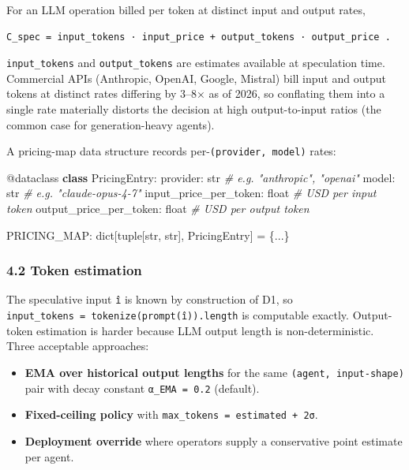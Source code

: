 \documentclass[
  11pt,
]{article}
\newenvironment{Shaded}{}{}
\newcommand{\AttributeTok}[1]{\textcolor[rgb]{0.49,0.56,0.16}{#1}}
\newcommand{\BuiltInTok}[1]{\textcolor[rgb]{0.00,0.50,0.00}{#1}}
\newcommand{\CommentTok}[1]{\textcolor[rgb]{0.38,0.63,0.69}{\textit{#1}}}
\newcommand{\KeywordTok}[1]{\textcolor[rgb]{0.00,0.44,0.13}{\textbf{#1}}}
\newcommand{\NormalTok}[1]{#1}
\newcommand{\OperatorTok}[1]{\textcolor[rgb]{0.40,0.40,0.40}{#1}}
\providecommand{\tightlist}{%
  \setlength{\itemsep}{0pt}\setlength{\parskip}{0pt}}
\begin{document}
For an LLM operation billed per token at distinct input and output
rates,

\begin{verbatim}
C_spec = input_tokens · input_price + output_tokens · output_price .
\end{verbatim}

\texttt{input\_tokens} and \texttt{output\_tokens} are estimates
available at speculation time. Commercial APIs (Anthropic, OpenAI,
Google, Mistral) bill input and output tokens at distinct rates
differing by 3--8× as of 2026, so conflating them into a single rate
materially distorts the decision at high output-to-input ratios (the
common case for generation-heavy agents).

A pricing-map data structure records per-\texttt{(provider,\ model)}
rates:

\begin{Shaded}
\begin{Highlighting}[]
\AttributeTok{@dataclass}
\KeywordTok{class}\NormalTok{ PricingEntry:}
\NormalTok{    provider: }\BuiltInTok{str}                       \CommentTok{\# e.g. "anthropic", "openai"}
\NormalTok{    model: }\BuiltInTok{str}                          \CommentTok{\# e.g. "claude{-}opus{-}4{-}7"}
\NormalTok{    input\_price\_per\_token: }\BuiltInTok{float}        \CommentTok{\# USD per input token}
\NormalTok{    output\_price\_per\_token: }\BuiltInTok{float}       \CommentTok{\# USD per output token}

\NormalTok{PRICING\_MAP: }\BuiltInTok{dict}\NormalTok{[}\BuiltInTok{tuple}\NormalTok{[}\BuiltInTok{str}\NormalTok{, }\BuiltInTok{str}\NormalTok{], PricingEntry] }\OperatorTok{=}\NormalTok{ \{...\}}
\end{Highlighting}
\end{Shaded}

\subsubsection{4.2 Token estimation}\label{token-estimation}

The speculative input \texttt{î} is known by construction of D1, so
\texttt{input\_tokens\ =\ tokenize(prompt(î)).length} is computable
exactly. Output-token estimation is harder because LLM output length is
non-deterministic. Three acceptable approaches:

\begin{itemize}
\tightlist
\item
  \textbf{EMA over historical output lengths} for the same
  \texttt{(agent,\ input-shape)} pair with decay constant
  \texttt{α\_EMA\ =\ 0.2} (default).
\item
  \textbf{Fixed-ceiling policy} with
  \texttt{max\_tokens\ =\ estimated\ +\ 2σ}.
\item
  \textbf{Deployment override} where operators supply a conservative
  point estimate per agent.
\end{itemize}
\end{document}
